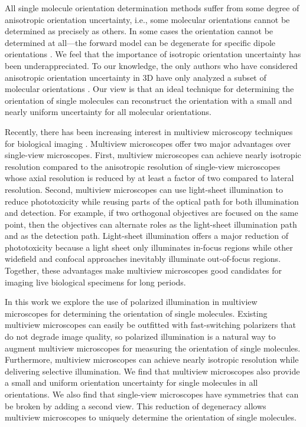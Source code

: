 \documentclass[10pt]{article}
\begin{document}
All single molecule orientation determination methods suffer from some degree of
anisotropic orientation uncertainty, i.e., some molecular orientations cannot be
determined as precisely as others. In some cases the orientation cannot be
determined at all---the forward model can be degenerate for specific dipole
orientations \cite{fourkas2001, lu2008}. We feel that the importance of
isotropic orientation uncertainty has been underappreciated. To our knowledge,
the only authors who have considered anisotropic orientation uncertainty in 3D
have only analyzed a subset of molecular orientations \cite{agrawal2012}. Our
view is that an ideal technique for determining the orientation of single
molecules can reconstruct the orientation with a small and nearly uniform
uncertainty for all molecular orientations.

Recently, there has been increasing interest in multiview microscopy techniques
for biological imaging \cite{wu2013, keller2015, wu2016, wu2017}. Multiview
microscopes offer two major advantages over single-view microscopes. First,
multiview microscopes can achieve nearly isotropic resolution compared to the
anisotropic resolution of single-view microscopes whose axial resolution is
reduced by at least a factor of two compared to lateral resolution. Second,
multiview microscopes can use light-sheet illumination to reduce phototoxicity
while reusing parts of the optical path for both illumination and detection. For
example, if two orthogonal objectives are focused on the same point, then the
objectives can alternate roles as the light-sheet illumination path and as the
detection path. Light-sheet illumination offers a major reduction of
phototoxicity because a light sheet only illuminates in-focus regions while
other widefield and confocal approaches inevitably illuminate out-of-focus
regions. Together, these advantages make multiview microscopes good candidates
for imaging live biological specimens for long periods.

In this work we explore the use of polarized illumination in multiview
microscopes for determining the orientation of single molecules. Existing
multiview microscopes can easily be outfitted with fast-switching polarizers
that do not degrade image quality, so polarized illumination is a natural way to
augment multiview microscopes for measuring the orientation of single
molecules. Furthermore, multiview microscopes can achieve nearly isotropic
resolution while delivering selective illumination. We find that multiview
microscopes also provide a small and uniform orientation uncertainty for single
molecules in all orientations. We also find that single-view microscopes have
symmetries that can be broken by adding a second view. This reduction of
degeneracy allows multiview microscopes to uniquely determine the orientation of
single molecules.
\end{document}
